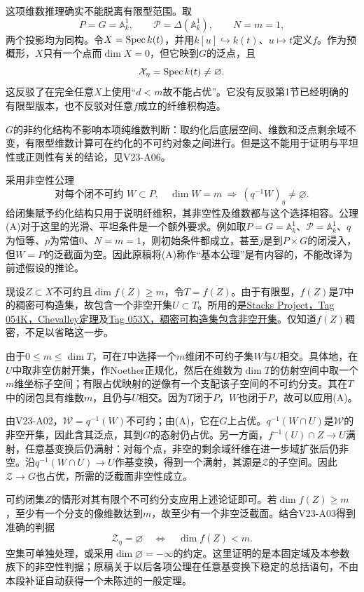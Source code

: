这项维数推理确实不能脱离有限型范围。取
\[
P=G=\mathbb A^1_k,\qquad
\mathcal P=\Delta(\mathbb A^1_k),\qquad N=m=1,
\]
两个投影均为同构。令$X=\operatorname{Spec} k(t)$，并用$k[u]\hookrightarrow k(t)$、$u\mapsto t$定义$f$。作为预概形，$X$只有一个点而$\dim X=0$，但它映到$G$的泛点，且
\[
\mathcal X_\eta=\operatorname{Spec} k(t)\ne\varnothing.
\]
这反驳了在完全任意$X$上使用“$d<m$故不能占优”。它没有反驳第1节已经明确的有限型版本，也不反驳对任意$f$成立的纤维积构造。

$G$的非约化结构不影响本项纯维数判断：取约化后底层空间、维数和泛点剩余域不变，有限型维数计算可在约化的不可约对象之间进行。但是这不能用于证明与平坦性或正则性有关的结论，见V23-A06。

采用非空性公理
\[
\text{对每个闭不可约 }W\subset P,\quad
\dim W=m\ \Longrightarrow\ (q^{-1}W)_\eta\ne\varnothing.
\tag{A}
\]
给闭集赋予约化结构只用于说明纤维积，其非空性及维数都与这个选择相容。公理(A)对于这里的光滑、平坦条件是一个额外要求。例如取$P=G=\mathbb A^1_k$、$\mathcal P=\mathbb A^1_k$、$q$为恒等、$p$为常值$0$、$N=m=1$，则初始条件都成立，甚至$j$是到$P\times G$的闭浸入，但$W=P$的泛截面为空。因此原稿将(A)称作“基本公理”是有内容的，不能改译为前述假设的推论。

现设$Z\subset X$不可约且$\dim f(Z)\geq m$，令$T=\overline{f(Z)}$。由于有限型，$f(Z)$是$T$中的稠密可构造集，故包含一个非空开集$U\subset T$。所用的是\href{https://stacks.math.columbia.edu/tag/054K}{Stacks Project，Tag 054K，Chevalley定理}及\href{https://stacks.math.columbia.edu/tag/053X}{Tag 053X，稠密可构造集包含非空开集}。仅知道$f(Z)$稠密，不足以省略这一步。

由于$0\leq m\leq\dim T$，可在$T$中选择一个$m$维闭不可约子集$W$与$U$相交。具体地，在$U$中取非空仿射开集，作Noether正规化，然后在维数为$\dim T$的仿射空间中取一个$m$维坐标子空间；有限占优映射的逆像有一个支配该子空间的不可约分支。其在$T$中的闭包具有维数$m$，且仍与$U$相交。因为$T$闭于$P$，$W$也闭于$P$，故可以应用(A)。

由V23-A02，$\mathcal W=q^{-1}(W)$不可约；由(A)，它在$G$上占优。$q^{-1}(W\cap U)$是$\mathcal W$的非空开集，因此含其泛点，其到$G$的态射仍占优。另一方面，$f^{-1}(U)\cap Z\to U$满射，任意基变换后仍满射：对每个点，非空的剩余域纤维在进一步域扩张后仍非空。沿$q^{-1}(W\cap U)\to U$作基变换，得到一个满射，其源是$\mathcal Z$的子空间。因此$\mathcal Z\to G$也占优，所需的泛截面非空性成立。

可约闭集$Z$的情形对其有限个不可约分支应用上述论证即可。若$\dim f(Z)\geq m$，至少有一个分支的像维数达到$m$，故至少有一个非空泛截面。结合V23-A03得到准确的判据
\[
\mathcal Z_\eta=\varnothing
\quad\Longleftrightarrow\quad
\dim f(Z)<m.
\]
空集可单独处理，或采用$\dim\varnothing=-\infty$的约定。这里证明的是本固定域及本参数族下的非空性判据；原稿关于以后各项公理在任意基变换下稳定的总括语句，不由本段补证自动获得一个未陈述的一般定理。

